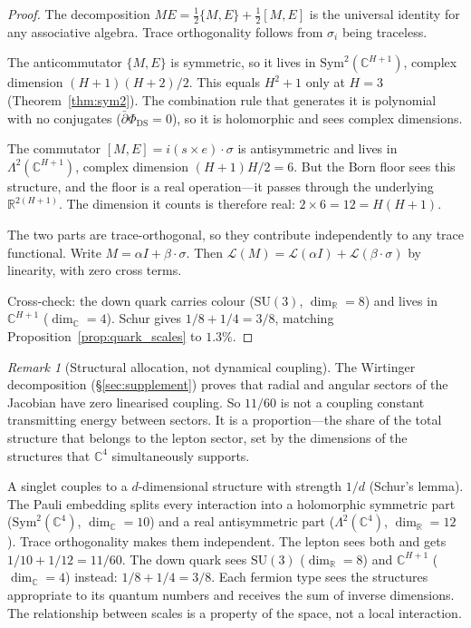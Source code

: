\documentclass[11pt,a4paper]{article}
\theoremstyle{definition}
\theoremstyle{remark}
\newtheorem{remark}[theorem]{Remark}
\newcommand{\C}{\mathbb{C}}
\newcommand{\R}{\mathbb{R}}
\newcommand{\dbar}{\bar{\partial}}
\newcommand{\SU}{\mathrm{SU}}
\newcommand{\Sym}{\mathrm{Sym}}
\begin{document}
\begin{proof}
The decomposition $ME=\frac{1}{2}\{M,E\}+\frac{1}{2}[M,E]$ is the universal identity for any associative algebra. Trace orthogonality follows from $\sigma_i$ being traceless.

The anticommutator $\{M,E\}$ is symmetric, so it lives in $\Sym^2(\C^{H+1})$, complex dimension $(H\!+\!1)(H\!+\!2)/2$. This equals $H^2+1$ only at $H=3$ (Theorem~\ref{thm:sym2}). The combination rule that generates it is polynomial with no conjugates ($\dbar\Phi_\mathrm{DS}=0$), so it is holomorphic and sees complex dimensions.

The commutator $[M,E]=i(s\times e)\cdot\sigma$ is antisymmetric and lives in $\Lambda^2(\C^{H+1})$, complex dimension $(H\!+\!1)H/2=6$. But the Born floor sees this structure, and the floor is a real operation---it passes through the underlying $\R^{2(H+1)}$. The dimension it counts is therefore real: $2\times 6=12=H(H+1)$.

The two parts are trace-orthogonal, so they contribute independently to any trace functional. Write $M=\alpha I+\beta\cdot\sigma$. Then $\mathcal{L}(M)=\mathcal{L}(\alpha I)+\mathcal{L}(\beta\cdot\sigma)$ by linearity, with zero cross terms.

Cross-check: the down quark carries colour ($\SU(3)$, $\dim_\R=8$) and lives in $\C^{H+1}$ ($\dim_\C=4$). Schur gives $1/8+1/4=3/8$, matching Proposition~\ref{prop:quark_scales} to $1.3\%$.
\end{proof}

\begin{remark}[Structural allocation, not dynamical coupling]\label{rem:structural_allocation}
The Wirtinger decomposition (\S\ref{sec:supplement}) proves that radial and angular sectors of the Jacobian have zero linearised coupling. So $11/60$ is not a coupling constant transmitting energy between sectors. It is a proportion---the share of the total structure that belongs to the lepton sector, set by the dimensions of the structures that $\C^4$ simultaneously supports.

A singlet couples to a $d$-dimensional structure with strength $1/d$ (Schur's lemma). The Pauli embedding splits every interaction into a holomorphic symmetric part ($\Sym^2(\C^4)$, $\dim_\C=10$) and a real antisymmetric part ($\Lambda^2(\C^4)$, $\dim_\R=12$). Trace orthogonality makes them independent. The lepton sees both and gets $1/10+1/12=11/60$. The down quark sees $\SU(3)$ ($\dim_\R=8$) and $\C^{H+1}$ ($\dim_\C=4$) instead: $1/8+1/4=3/8$. Each fermion type sees the structures appropriate to its quantum numbers and receives the sum of inverse dimensions. The relationship between scales is a property of the space, not a local interaction.
\end{remark}
\end{document}
